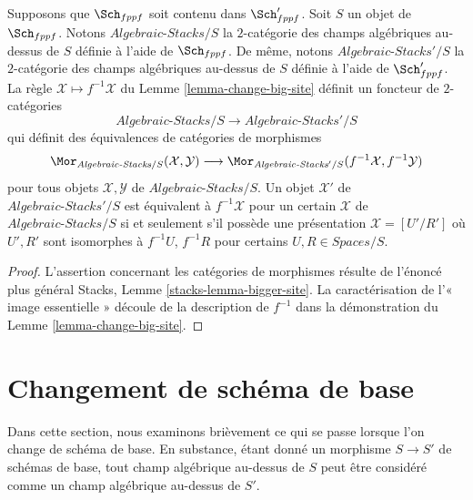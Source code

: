 \begin{lemma}
\label{lemma-fully-faithful}
Supposons que $\Sch_{fppf}$ soit contenu dans $\Sch'_{fppf}$.
Soit $S$ un objet de $\Sch_{fppf}$. Notons
$\textit{Algebraic-Stacks}/S$ la $2$-catégorie des champs algébriques au-dessus de $S$
définie à l'aide de $\Sch_{fppf}$. De même, notons
$\textit{Algebraic-Stacks}'/S$ la $2$-catégorie des champs algébriques au-dessus de $S$
définie à l'aide de $\Sch'_{fppf}$. La règle
$\mathcal{X} \mapsto f^{-1}\mathcal{X}$ du
Lemme \ref{lemma-change-big-site}
définit un foncteur de $2$-catégories
$$
\textit{Algebraic-Stacks}/S \longrightarrow \textit{Algebraic-Stacks}'/S
$$
qui définit des équivalences de catégories de morphismes
$$
\Mor_{\textit{Algebraic-Stacks}/S}(\mathcal{X}, \mathcal{Y})
\longrightarrow
\Mor_{\textit{Algebraic-Stacks}'/S}(f^{-1}\mathcal{X}, f^{-1}\mathcal{Y})
$$
pour tous objets $\mathcal{X}, \mathcal{Y}$ de
$\textit{Algebraic-Stacks}/S$. Un objet
$\mathcal{X}'$ de $\textit{Algebraic-Stacks}'/S$
est équivalent à $f^{-1}\mathcal{X}$ pour un certain
$\mathcal{X}$ de $\textit{Algebraic-Stacks}/S$
si et seulement s'il possède une présentation $\mathcal{X} = [U'/R']$
où $U', R'$ sont isomorphes à $f^{-1}U$, $f^{-1}R$ pour certains
$U, R \in \textit{Spaces}/S$.
\end{lemma}

\begin{proof}
L'assertion concernant les catégories de morphismes résulte de l'énoncé plus général
Stacks, Lemme \ref{stacks-lemma-bigger-site}.
La caractérisation de l'« image essentielle » découle de la description
de $f^{-1}$ dans la démonstration du
Lemme \ref{lemma-change-big-site}.
\end{proof}


\section{Changement de schéma de base}
\label{section-change-base-scheme}

\noindent
Dans cette section, nous examinons brièvement ce qui se passe lorsque l'on change de schéma de base.
En substance, étant donné un morphisme $S \to S'$ de schémas de base, tout champ
algébrique au-dessus de $S$ peut être considéré comme un champ algébrique au-dessus de $S'$.


